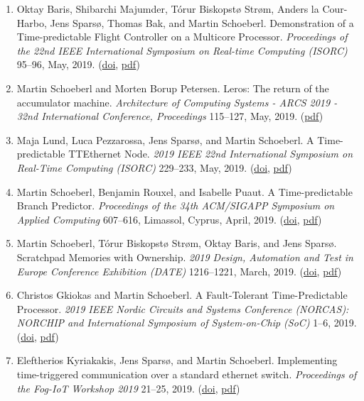 \begin{enumerate}
\item Oktay Baris, Shibarchi Majumder, T{\'o}rur Biskopst{\o} Str{\o}m, Anders la Cour-Harbo, Jens Spars{\o}, Thomas Bak, and Martin Schoeberl.
 Demonstration of a Time-predictable Flight Controller on a Multicore Processor.
 \emph{Proceedings of the 22nd IEEE International Symposium on Real-time Computing (ISORC)} 95--96, May, 2019.
(\href{http://dx.doi.org/10.1109/ISORC.2019.00029}{doi}, \href{https://www.jopdesign.com/doc/dronecmp.pdf}{pdf})

\item Martin Schoeberl and {Morten Borup} Petersen.
 Leros: The return of the accumulator machine.
 \emph{Architecture of Computing Systems - ARCS 2019 - 32nd International Conference, Proceedings} 115--127, May, 2019.
(\href{https://www.jopdesign.com/doc/leros32.pdf}{pdf})

\item Maja Lund, Luca Pezzarossa, Jens Spars{\o}, and Martin Schoeberl.
 A Time-predictable TTEthernet Node.
 \emph{2019 IEEE 22nd International Symposium on Real-Time Computing (ISORC)} 229--233, May, 2019.
(\href{http://dx.doi.org/10.1109/ISORC.2019.00048}{doi}, \href{https://www.jopdesign.com/doc/ttenode-short.pdf}{pdf})

\item Martin Schoeberl, Benjamin Rouxel, and Isabelle Puaut.
 A Time-predictable Branch Predictor.
 \emph{Proceedings of the 34th ACM/SIGAPP Symposium on Applied Computing} 607--616, Limassol, Cyprus, April, 2019.
(\href{http://dx.doi.org/10.1145/3297280.3297337}{doi}, \href{https://www.jopdesign.com/doc/branchpred.pdf}{pdf})

\item Martin Schoeberl, T{\'o}rur Biskopst{\o} Str{\o}m, Oktay Baris, and Jens Spars{\o}.
 Scratchpad Memories with Ownership.
 \emph{2019 Design, Automation and Test in Europe Conference Exhibition (DATE)} 1216--1221, March, 2019.
(\href{http://dx.doi.org/10.23919/DATE.2019.8714926}{doi}, \href{https://www.jopdesign.com/doc/ownspm.pdf}{pdf})

\item Christos Gkiokas and Martin Schoeberl.
 A Fault-Tolerant Time-Predictable Processor.
 \emph{2019 IEEE Nordic Circuits and Systems Conference (NORCAS): NORCHIP and International Symposium of System-on-Chip (SoC)} 1--6, 2019.
(\href{http://dx.doi.org/10.1109/NORCHIP.2019.8906947}{doi}, \href{https://www.jopdesign.com/doc/lockpat.pdf}{pdf})

\item Eleftherios Kyriakakis, Jens Spars{\o}, and Martin Schoeberl.
 Implementing time-triggered communication over a standard ethernet switch.
 \emph{Proceedings of the Fog-IoT Workshop 2019} 21--25, 2019.
(\href{http://dx.doi.org/10.1145/3313150.3313221}{doi}, \href{https://www.jopdesign.com/doc/poorman-tte.pdf}{pdf})



\end{enumerate}
